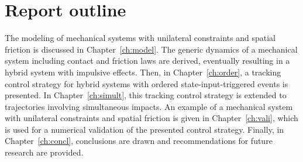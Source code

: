 \documentclass[../DC2017114Bouma.tex]{subfiles}
\begin{document}
\section{Report outline}
The modeling of mechanical systems with unilateral constraints and spatial friction is discussed in Chapter~\ref{ch:model}. The generic dynamics of a mechanical system including contact and friction laws are derived, eventually resulting in a hybrid system with impulsive effects. Then, in Chapter~\ref{ch:order}, a tracking control strategy for hybrid systems with ordered state-input-triggered events is presented. In Chapter~\ref{ch:simult}, this tracking control strategy is extended to trajectories involving simultaneous impacts. An example of a mechanical system with unilateral constraints and spatial friction is given in Chapter~\ref{ch:vali}, which is used for a numerical validation of the presented control strategy. Finally, in Chapter~\ref{ch:concl}, conclusions are drawn and recommendations for future research are provided.
\end{document}
